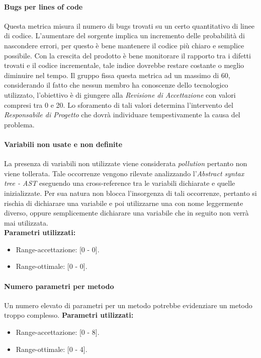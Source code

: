 			\paragraph{Bugs per lines of code}
			Questa metrica misura il numero di bugs trovati su un certo quantitativo di linee di codice. L'aumentare del sorgente implica un incremento delle probabilità di nascondere errori, per questo è bene mantenere il codice più chiaro e semplice possibile. Con la crescita del prodotto è bene monitorare il rapporto tra i difetti trovati e il codice incrementale, tale indice dovrebbe restare costante o meglio diminuire nel tempo.  Il gruppo fissa questa metrica ad un massimo di 60, considerando il fatto che nessun membro ha conoscenze dello  tecnologico utilizzato, l'obiettivo è di giungere alla \emph{Revisione di Accettazione} con valori compresi tra 0 e 20. Lo sforamento di tali valori determina l'intervento del \emph{Responsabile di Progetto} che dovrà individuare tempestivamente la causa del problema.
			
			
			\paragraph{Variabili non usate e non definite}
			La presenza di variabili non utilizzate viene considerata \emph{pollution} pertanto non viene tollerata. Tale occorrenze vengono rilevate analizzando l'\emph{Abstract syntax tree - AST} eseguendo una cross-reference tra le variabili dichiarate e quelle inizializzate. Per sua natura  non blocca l'insorgenza di tali occorrenze, pertanto si rischia  di dichiarare una variabile e poi utilizzarne una con nome leggermente diverso, oppure semplicemente dichiarare una variabile che in seguito non verrà mai utilizzata.\\
			\textbf{Parametri utilizzati:}
			\begin{itemize}
				\item Range-accettazione: [0 - 0].
				\item Range-ottimale: [0 - 0].
			\end{itemize}
			
			\paragraph{Numero parametri per metodo}
			Un numero elevato di parametri per un metodo potrebbe evidenziare un metodo troppo complesso.
			\textbf{Parametri utilizzati:}
			\begin{itemize}
				\item Range-accettazione: [0 - 8].
				\item Range-ottimale: [0 - 4].
			\end{itemize}
			
